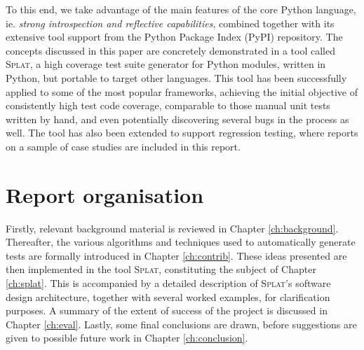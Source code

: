 To this end, we take advantage of the main features of the core Python language, ie. \emph{strong introspection and reflective capabilities}, combined together with its extensive tool support from the Python Package Index (PyPI) repository.
\clearpage
The concepts discussed in this paper are concretely demonstrated in a tool called \textsc{Splat}, a high coverage test suite generator for Python modules, written in Python, but portable to target other languages. This tool has been successfully applied to some of the most popular frameworks, achieving the initial objective of consistently high test code coverage, comparable to those manual unit tests written by hand, and even potentially discovering several bugs in the process as well. The tool has also been extended to support regression testing, where reports on a sample of case studies are included in this report.

\section{Report organisation}
Firstly, relevant background material is reviewed in Chapter \ref{ch:background}. Thereafter, the various algorithms and techniques used to automatically generate tests are formally introduced in Chapter \ref{ch:contrib}. These ideas presented are then implemented in the tool \textsc{Splat}, constituting the subject of Chapter \ref{ch:splat}. This is accompanied by a detailed description of \textsc{Splat}'s software design architecture, together with several worked examples, for clarification purposes. A summary of the extent of success of the project is discussed in Chapter \ref{ch:eval}. Lastly, some final conclusions are drawn, before suggestions are given to possible future work in Chapter \ref{ch:conclusion}.
